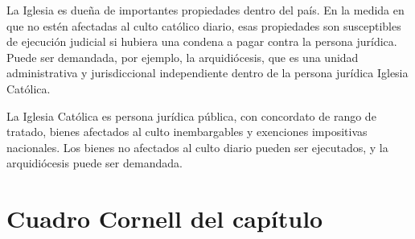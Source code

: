 \documentclass[12pt,oneside]{book}
\begin{document}
La Iglesia es dueña de importantes propiedades dentro del país. En la medida en que no estén afectadas al culto católico diario, esas propiedades son susceptibles de ejecución judicial si hubiera una condena a pagar contra la persona jurídica. Puede ser demandada, por ejemplo, la arquidiócesis, que es una unidad administrativa y jurisdiccional independiente dentro de la persona jurídica Iglesia Católica.

\begin{important}
La Iglesia Católica es persona jurídica pública, con concordato de rango de tratado, bienes afectados al culto inembargables y exenciones impositivas nacionales. Los bienes no afectados al culto diario pueden ser ejecutados, y la arquidiócesis puede ser demandada.
\end{important}

\section{Cuadro Cornell del capítulo}
\end{document}
